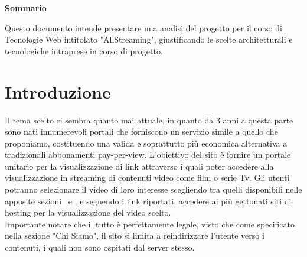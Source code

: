 

\newpage

\vspace*{0.5cm} %
\begin{center}

\textbf{{\Large{Sommario}}}

Questo documento intende presentare una analisi del progetto per il corso di Tecnologie Web intitolato "AllStreaming", giustificando le scelte architetturali e tecnologiche intraprese in corso di progetto.


\vspace*{0.2cm} %

\end{center}




\newpage

\tableofcontents %

\let\cleardoublepage\clearpage %


\listoffigures




\newpage


\section{Introduzione}
Il tema scelto ci sembra quanto mai attuale, in quanto da 3 anni a questa parte sono nati innumerevoli portali che forniscono un servizio simile a quello che proponiamo, costituendo una valida e soprattutto più economica alternativa a tradizionali abbonamenti pay-per-view.
L'obiettivo del sito è fornire un portale unitario per la visualizzazione di link attraverso i quali poter accedere alla visualizzazione in streaming di contenuti video come film o serie Tv.
Gli utenti potranno selezionare il video di loro interesse scegliendo tra quelli disponibili nelle apposite sezioni \film \ e \serie, e seguendo i link riportati, accedere ai più gettonati siti di hosting per la visualizzazione del video scelto.\\
Importante notare che il tutto è perfettamente legale, visto che come specificato nella sezione "Chi Siamo", il sito si limita a reindirizzare l'utente verso i contenuti, i quali non sono ospitati dal server stesso.

